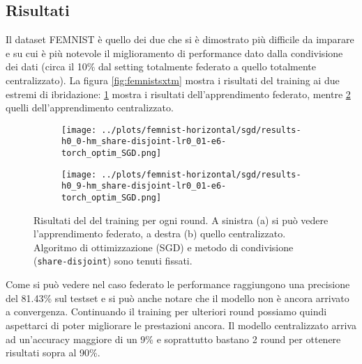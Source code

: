 \subsection{Risultati}
Il dataset FEMNIST è quello dei due che si è dimostrato più difficile 
da imparare e su cui è più notevole il miglioramento di performance 
dato dalla condivisione dei dati (circa il 10\% dal setting totalmente
federato a quello totalmente centralizzato). La figura \ref{fig:femnistsxtm}
mostra i risultati del training ai due estremi di ibridazione:
\ref{fig:femnistsxtm-a} mostra i risultati dell'apprendimento federato,
mentre \ref{fig:femnistsxtm-b} quelli dell'apprendimento centralizzato.
\begin{figure}[hb]  %
    \centering
    \begin{subfigure}[b]{0.49\textwidth}
        \centering
        \texttt{[image: ../plots/femnist-horizontal/sgd/results-h0\_0-hm\_share-disjoint-lr0\_01-e6-torch\_optim\_SGD.png]}
        \label{fig:femnistsxtm-a}
    \end{subfigure}
    \hfill
    \begin{subfigure}[b]{0.49\textwidth}
        \centering
        \texttt{[image: ../plots/femnist-horizontal/sgd/results-h0\_9-hm\_share-disjoint-lr0\_01-e6-torch\_optim\_SGD.png]}
        \label{fig:femnistsxtm-b}
    \end{subfigure}
    
    \caption{
        Risultati del del training per ogni round. A sinistra (a) si può 
        vedere l'apprendimento federato, a destra (b) quello centralizzato.
        Algoritmo di ottimizzazione (SGD) e metodo di condivisione 
        (\texttt{share-disjoint}) sono tenuti fissati.
    }
    \label{fig:femnistrandom}
\end{figure}


Come si può vedere nel caso federato 
le performance raggiungono una precisione del 81.43\% sul testset 
e si può anche notare che il modello non è ancora arrivato a convergenza.
Continuando il training per ulteriori round possiamo quindi aspettarci 
di poter migliorare le prestazioni ancora.
Il modello centralizzato arriva ad un'accuracy maggiore di un 9\% e 
soprattutto bastano 2 round per ottenere risultati sopra al 90\%.

